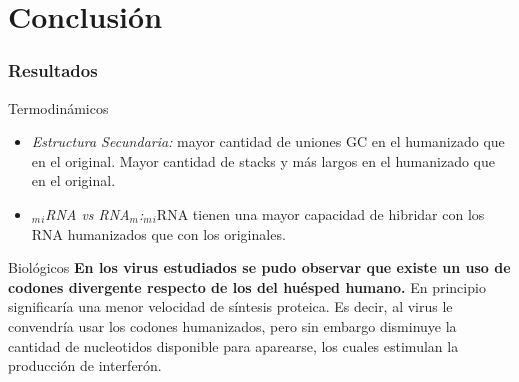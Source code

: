 
\section{Conclusión}
      \begin{frame}\frametitle{\textbf{Resultados}}
        \begin{block}{Termodinámicos}
           \begin{itemize}
              \item \textit{Estructura Secundaria:} mayor cantidad de uniones GC en el humanizado que en el original. Mayor cantidad de stacks y más largos en el humanizado que en el original.

              \item \textit{$_m$$_i$RNA vs RNA$_m$:}$_m$$_i$RNA tienen una mayor capacidad de hibridar con los RNA humanizados que con los originales. 

            \end{itemize}                  
        \end{block}

        \begin{block}{Biológicos}
          \textbf{En los virus estudiados se pudo observar que existe un uso de codones divergente respecto de los del huésped humano.} En principio significaría una menor velocidad de síntesis proteica.
          Es decir, al virus le convendría usar los codones humanizados, pero sin embargo disminuye la cantidad de nucleotidos disponible para aparearse, los cuales estimulan la producción de interferón.

        \end{block}
      \end{frame}    

